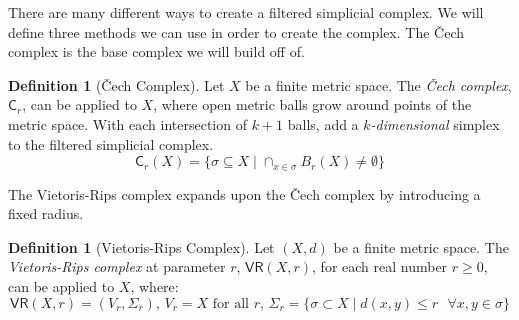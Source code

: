 \documentclass[ma]{uncgdissertationexp}
\theoremstyle{plain}
\theoremstyle{definition}
\newtheorem{definition}[theorem]{Definition}
\theoremstyle{remark}
\begin{document}
\par There are many different ways to create a filtered simplicial complex. We will define three methods we can use in order to create the complex. The Čech complex is the base complex we will build off of.

\begin{definition}[Čech Complex]
Let $X$ be a finite metric space. The \textit{Čech complex}, $\mathsf{C}_r$, can be applied to $X$, where open metric balls grow around points of the metric space. With each intersection of $k+1$ balls, add a $k$\textit{-dimensional} simplex to the filtered simplicial complex.\\
$$\mathsf{C}_{r}(X) = \{\sigma \subseteq X \mid \cap_{x \in \sigma} B_{r}(X) \not= \emptyset\}$$
\end{definition}

\par The Vietoris-Rips complex expands upon the Čech complex by introducing a fixed radius.

\begin{definition}[Vietoris-Rips Complex]
Let $(X, d)$ be a finite metric space. The \textit{Vietoris-Rips complex} at parameter $r$, $\mathsf{VR}(X, r)$, for each real number $r\geq0$, can be applied to $X$, where:
$$\mathsf{VR}(X, r) = (V_{r}, \Sigma_{r})\text{, }V_{r}=X\text{ for all }r\text{, }\Sigma_{r} = \{\sigma \subset X \mid d(x,y) \leq r\text{ }\forall x, y \in \sigma\}$$
\end{definition}
\end{document}
